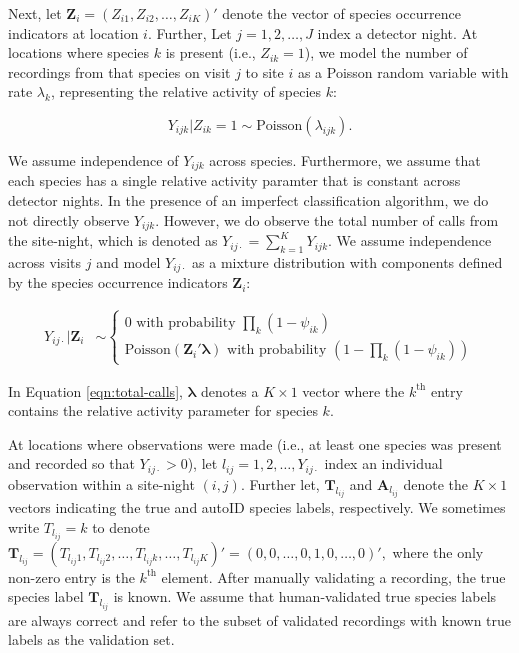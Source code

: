 \documentclass[
]{article}
\begin{document}
Next, let \(\mathbf{Z}_{i} = (Z_{i1}, Z_{i2}, \dots, Z_{iK})'\) denote the vector of species occurrence indicators at location \(i\). Further, Let \(j = 1, 2, \dots, J\) index a detector night. At locations where species \(k\) is present (i.e., \(Z_{ik} = 1\)), we model the number of recordings from that species on visit \(j\) to site \(i\) as a Poisson random variable with rate \(\lambda_{k}\), representing the relative activity of species \(k\):

\[Y_{ijk} \vert Z_{ik} = 1 \sim \text{Poisson}(\lambda_{ijk}).\]

\noindent We assume independence of \(Y_{ijk}\) across species. Furthermore, we assume that each species has a single relative activity paramter that is constant across detector nights. In the presence of an imperfect classification algorithm, we do not directly observe \(Y_{ijk}.\) However, we do observe the total number of calls from the site-night, which is denoted as \(Y_{ij\cdot} = \sum_{k=1}^K Y_{ijk}\). We assume independence across visits \(j\) and model \(Y_{ij\cdot}\) as a mixture distribution with components defined by the species occurrence indicators \(\mathbf{Z}_{i}\):

\begin{align}
    Y_{ij\cdot} \vert \mathbf{Z}_i &\sim 
            \begin{cases}
                0 \text{ with probability } \prod_k (1 - \psi_{ik}) \\ 
                \text{Poisson}\left(\mathbf{Z}_{i}' \boldsymbol{\lambda}\right) \text{ with probability } (1 - \prod_k (1 - \psi_{ik})) 
            \end{cases} \label{eqn:total-calls}
\end{align}

\noindent In Equation \ref{eqn:total-calls}, \(\boldsymbol{\lambda}\) denotes a \(K \times 1\) vector where the \(k^\text{th}\) entry contains the relative activity parameter for species \(k\).

At locations where observations were made (i.e., at least one species was present and recorded so that \(Y_{ij\cdot} > 0\)), let \(l_{ij} = 1, 2, \dots, Y_{ij\cdot}\) index an individual observation within a site-night \((i,j)\). Further let, \(\mathbf{T}_{l_{ij}}\) and \(\mathbf{A}_{l_{ij}}\) denote the \(K \times 1\) vectors indicating the true and autoID species labels, respectively. We sometimes write \(T_{l_{ij}} = k\) to denote \(\mathbf{T}_{l_{ij}} = (T_{l_{ij}1}, T_{l_{ij}2}, \dots, T_{l_{ij}k}, \dots, T_{l_{ij}K})' = (0, 0, \dots, 0, 1, 0, \dots, 0)',\) where the only non-zero entry is the \(k^{\text{th}}\) element. After manually validating a recording, the true species label \(\mathbf{T}_{l_{ij}}\) is known. We assume that human-validated true species labels are always correct and refer to the subset of validated recordings with known true labels as the validation set.
\end{document}

